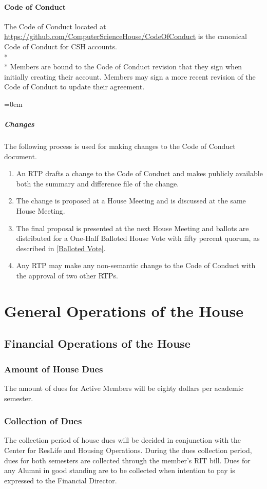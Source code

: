 \documentclass{article}
\newcommand{\article}[1]{\section{#1} \label{#1}}
\newcommand{\asection}[1]{\subsection{#1} \label{#1}}
\newcommand{\asubsection}[1]{\subsubsection{#1} \label{#1}}
\newcommand{\asubsubsection}[1]{\paragraph{#1} \label{#1}}
\newcommand{\asubsubsubsection}[1]{\parindent=0em\subparagraph{#1} \label{#1}}
\begin{document}
\asubsubsection{Code of Conduct}
The Code of Conduct located at \url{https://github.com/ComputerScienceHouse/CodeOfConduct} is the canonical Code of Conduct for CSH accounts.
\\* \\*
Members are bound to the Code of Conduct revision that they sign when initially creating their account.
Members may sign a more recent revision of the Code of Conduct to update their agreement.

\asubsubsubsection{Changes}
\renewcommand{\theenumi}{\alph{enumi}} %
The following process is used for making changes to the Code of Conduct document.
\begin{enumerate}
	\item An RTP drafts a change to the Code of Conduct and makes publicly available both the summary and difference file of the change.
	\item The change is proposed at a House Meeting and is discussed at the same House Meeting.
	\item The final proposal is presented at the next House Meeting and ballots are distributed for a One-Half Balloted House Vote with fifty percent quorum, as described in \ref{Balloted Vote}.
	\item Any RTP may make any non-semantic change to the Code of Conduct with the approval of two other RTPs.
\end{enumerate}

\article{General Operations of the House}

\asection{Financial Operations of the House}

\asubsection{Amount of House Dues}
The amount of dues for Active Members will be eighty dollars per academic semester.

\asubsection{Collection of Dues}
The collection period of house dues will be decided in conjunction with the Center for ResLife and Housing Operations.
During the dues collection period, dues for both semesters are collected through the member’s RIT bill.
Dues for any Alumni in good standing are to be collected when intention to pay is expressed to the Financial Director.
\end{document}
